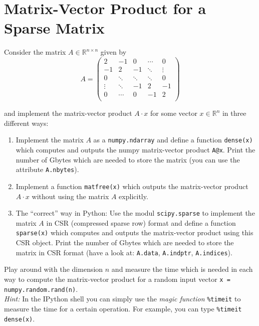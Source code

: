 \section{Matrix-Vector Product for a Sparse Matrix}
Consider the matrix $A \in \mathbb{R}^{n \times n}$ given by 
$$A = \begin{pmatrix}
2 & -1 		& 0  &\cdots & 0\\
-1 & 2 		& -1  &\ddots &  \vdots\\
 0 & \ddots  		&\ddots   	 &\ddots  & 0 \\
\vdots    & \ddots  		&-1  	 &2 & -1\\
0 & \cdots 	&  0  &-1 & 2\\
\end{pmatrix}$$

and implement the matrix-vector product $A \cdot x$ for some vector $x\in \mathbb{R}^n$ in three different ways:

\begin{enumerate}	
	\item Implement the matrix $A$ as a \verb|numpy.ndarray| and define a function \verb|dense(x)| which computes and outputs the numpy 			matrix-vector product \verb|A@x|. Print the number of Gbytes which are needed to store the matrix (you can use the attribute \verb|A.nbytes|).
	\item Implement a function \verb|matfree(x)| which outputs the matrix-vector product $A \cdot x$ without using the matrix $A$ explicitly.
	\item The ``correct'' way in Python: Use the modul \texttt{scipy.sparse} to implement the matrix $A$ in CSR (compressed sparse row) format and define a function \verb|sparse(x)| which computes and outputs the matrix-vector product using this CSR object. Print the number of Gbytes which are needed to store the matrix in CSR format (have a look at: \texttt{A.data}, \texttt{A.indptr}, \texttt{A.indices}).
\end{enumerate}
Play around with the dimension $n$ and measure the time which is needed in each way to compute the matrix-vector product for a random input vector \verb|x = numpy.random.rand(n)|.\\

\textit{Hint:} In the IPython shell you can simply use the \textit{magic function} \verb|%timeit| to measure the time for a certain operation. For example, you can type \verb|%timeit dense(x)|.  
